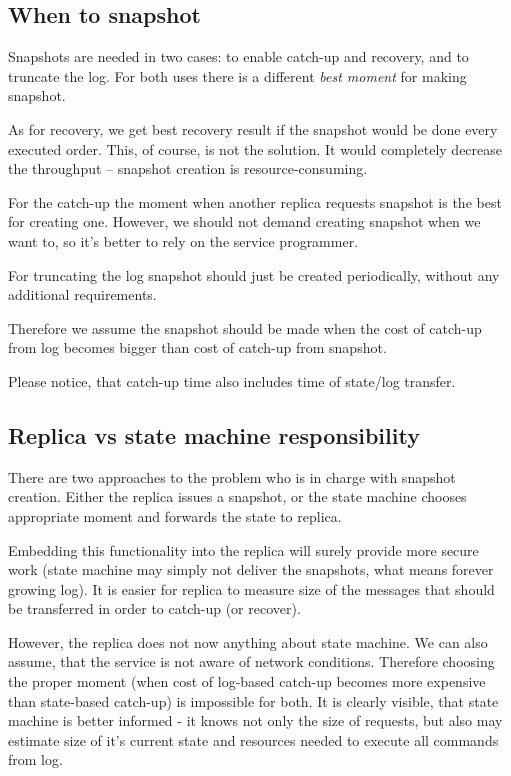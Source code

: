 \subsection{When to snapshot}
\label{subsec:when_to_snapshot}
Snapshots are needed in two cases: to enable catch-up and recovery, and to truncate the log. For both uses there is a different \textit{best moment} for making snapshot.

As for recovery, we get best recovery result if the snapshot would be done every executed order.
This, of course, is not the solution. It would completely decrease the throughput -- snapshot creation is resource-consuming.

For the catch-up the moment when another replica requests snapshot is the best for creating one. However, we should not demand creating snapshot when we want to, so it's better to rely on the service programmer.

For truncating the log snapshot should just be created periodically, without any additional requirements.

Therefore we assume the snapshot should be made when the cost of catch-up from log becomes bigger than cost of catch-up from snapshot.

Please notice, that catch-up time also includes time of state/log transfer.

\subsection{Replica vs state machine responsibility}
\label{subsec:replica_vs_state_machine_responsibility}
There are two approaches to the problem who is in charge with snapshot creation. Either the replica issues a snapshot, or the state machine chooses appropriate moment and forwards the state to replica.

Embedding this functionality into the replica will surely provide more secure work (state machine may simply not deliver the snapshots, what means forever growing log). It is easier for replica to measure size of the messages that should be transferred in order to catch-up (or recover).

However, the replica does not now anything about state machine. We can also assume, that the service is not aware of network conditions. Therefore choosing the proper moment (when cost of log-based catch-up becomes more expensive than state-based catch-up) is impossible for both. It is clearly visible, that state machine is better informed - it knows not only the size of requests, but also may estimate size of it's current state and resources needed to execute all commands from log.

